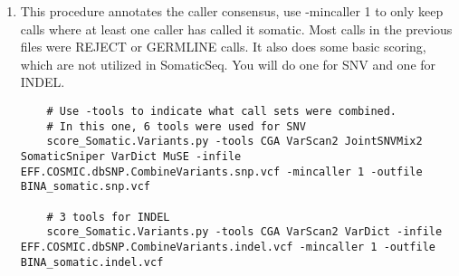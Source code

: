 \documentclass[10pt,letterpaper]{article}
\begin{document}
\begin{enumerate}
	
	\item
	This procedure annotates the caller consensus, use -mincaller 1 to only keep calls where at least one caller has called it somatic. Most calls in the previous files were REJECT or GERMLINE calls. It also does some basic scoring, which are not utilized in SomaticSeq. You will do one for SNV and one for INDEL. 
	
	\begin{lstlisting}
	# Use -tools to indicate what call sets were combined. 
	# In this one, 6 tools were used for SNV
	score_Somatic.Variants.py -tools CGA VarScan2 JointSNVMix2 SomaticSniper VarDict MuSE -infile EFF.COSMIC.dbSNP.CombineVariants.snp.vcf -mincaller 1 -outfile BINA_somatic.snp.vcf
	
	# 3 tools for INDEL
	score_Somatic.Variants.py -tools CGA VarScan2 VarDict -infile EFF.COSMIC.dbSNP.CombineVariants.indel.vcf -mincaller 1 -outfile BINA_somatic.indel.vcf
	\end{lstlisting}

	
	\end{enumerate}
\end{document}
